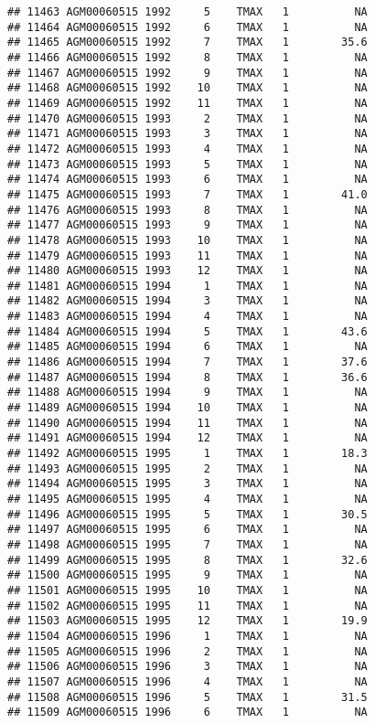 \documentclass{article}\usepackage[]{graphicx}\usepackage[]{color}
\makeatletter
\newenvironment{kframe}{%
 \def\at@end@of@kframe{}%
 \ifinner\ifhmode%
  \def\at@end@of@kframe{\end{minipage}}%
  \begin{minipage}{\columnwidth}%
 \fi\fi%
 \def\FrameCommand##1{\hskip\@totalleftmargin \hskip-\fboxsep
 \colorbox{shadecolor}{##1}\hskip-\fboxsep
     \hskip-\linewidth \hskip-\@totalleftmargin \hskip\columnwidth}%
 \MakeFramed {\advance\hsize-\width
   \@totalleftmargin\z@ \linewidth\hsize
   \@setminipage}}%
 {\par\unskip\endMakeFramed%
 \at@end@of@kframe}
\newenvironment{knitrout}{}{} %
\makeatother
\begin{document}
\begin{knitrout}
\begin{kframe}
\begin{verbatim}
## 11463 AGM00060515 1992     5    TMAX   1          NA
## 11464 AGM00060515 1992     6    TMAX   1          NA
## 11465 AGM00060515 1992     7    TMAX   1        35.6
## 11466 AGM00060515 1992     8    TMAX   1          NA
## 11467 AGM00060515 1992     9    TMAX   1          NA
## 11468 AGM00060515 1992    10    TMAX   1          NA
## 11469 AGM00060515 1992    11    TMAX   1          NA
## 11470 AGM00060515 1993     2    TMAX   1          NA
## 11471 AGM00060515 1993     3    TMAX   1          NA
## 11472 AGM00060515 1993     4    TMAX   1          NA
## 11473 AGM00060515 1993     5    TMAX   1          NA
## 11474 AGM00060515 1993     6    TMAX   1          NA
## 11475 AGM00060515 1993     7    TMAX   1        41.0
## 11476 AGM00060515 1993     8    TMAX   1          NA
## 11477 AGM00060515 1993     9    TMAX   1          NA
## 11478 AGM00060515 1993    10    TMAX   1          NA
## 11479 AGM00060515 1993    11    TMAX   1          NA
## 11480 AGM00060515 1993    12    TMAX   1          NA
## 11481 AGM00060515 1994     1    TMAX   1          NA
## 11482 AGM00060515 1994     3    TMAX   1          NA
## 11483 AGM00060515 1994     4    TMAX   1          NA
## 11484 AGM00060515 1994     5    TMAX   1        43.6
## 11485 AGM00060515 1994     6    TMAX   1          NA
## 11486 AGM00060515 1994     7    TMAX   1        37.6
## 11487 AGM00060515 1994     8    TMAX   1        36.6
## 11488 AGM00060515 1994     9    TMAX   1          NA
## 11489 AGM00060515 1994    10    TMAX   1          NA
## 11490 AGM00060515 1994    11    TMAX   1          NA
## 11491 AGM00060515 1994    12    TMAX   1          NA
## 11492 AGM00060515 1995     1    TMAX   1        18.3
## 11493 AGM00060515 1995     2    TMAX   1          NA
## 11494 AGM00060515 1995     3    TMAX   1          NA
## 11495 AGM00060515 1995     4    TMAX   1          NA
## 11496 AGM00060515 1995     5    TMAX   1        30.5
## 11497 AGM00060515 1995     6    TMAX   1          NA
## 11498 AGM00060515 1995     7    TMAX   1          NA
## 11499 AGM00060515 1995     8    TMAX   1        32.6
## 11500 AGM00060515 1995     9    TMAX   1          NA
## 11501 AGM00060515 1995    10    TMAX   1          NA
## 11502 AGM00060515 1995    11    TMAX   1          NA
## 11503 AGM00060515 1995    12    TMAX   1        19.9
## 11504 AGM00060515 1996     1    TMAX   1          NA
## 11505 AGM00060515 1996     2    TMAX   1          NA
## 11506 AGM00060515 1996     3    TMAX   1          NA
## 11507 AGM00060515 1996     4    TMAX   1          NA
## 11508 AGM00060515 1996     5    TMAX   1        31.5
## 11509 AGM00060515 1996     6    TMAX   1          NA

\end{verbatim}
\end{kframe}
\end{knitrout}
\end{document}
